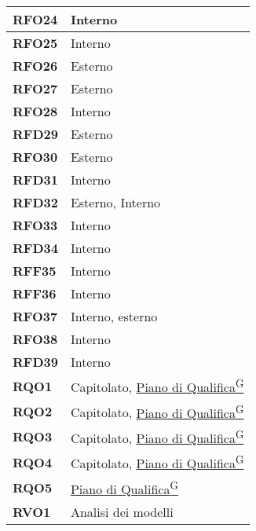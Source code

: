 \begin{longtable}{|>{\centering\arraybackslash}m{}|>{\centering\arraybackslash}m{}|}
	\textbf{RFO24}            & Interno\\\hline
	\textbf{RFO25}            & Interno\\\hline
	\textbf{RFO26}            & Esterno\\\hline
	\textbf{RFO27}            & Esterno\\\hline
	\textbf{RFO28}            & Interno\\\hline
	\textbf{RFD29}            & Esterno\\\hline
	\textbf{RFO30}            & Esterno\\\hline
	\textbf{RFD31}            & Interno\\\hline
	\textbf{RFD32}            & Esterno, Interno\\\hline
	\textbf{RFO33}            & Interno\\\hline
	\textbf{RFD34}            & Interno\\\hline
	\textbf{RFF35}            & Interno\\\hline
	\textbf{RFF36}            & Interno\\\hline
	\textbf{RFO37}            & Interno, esterno\\\hline
	\textbf{RFO38}            & Interno\\\hline
	\textbf{RFD39}            & Interno\\\hline
	\textbf{RQO1}            & Capitolato, \href{https://code7crusaders.github.io/docs/RTB/documentazione_interna/glossario.html#piano-di-qualifica}{Piano di Qualifica\textsuperscript{G}}\\\hline
	\textbf{RQO2}            & Capitolato, \href{https://code7crusaders.github.io/docs/RTB/documentazione_interna/glossario.html#piano-di-qualifica}{Piano di Qualifica\textsuperscript{G}}\\\hline
	\textbf{RQO3}            & Capitolato, \href{https://code7crusaders.github.io/docs/RTB/documentazione_interna/glossario.html#piano-di-qualifica}{Piano di Qualifica\textsuperscript{G}}\\\hline
	\textbf{RQO4}            & Capitolato, \href{https://code7crusaders.github.io/docs/RTB/documentazione_interna/glossario.html#piano-di-qualifica}{Piano di Qualifica\textsuperscript{G}}\\\hline
	\textbf{RQO5}            & \href{https://code7crusaders.github.io/docs/RTB/documentazione_interna/glossario.html#piano-di-qualifica}{Piano di Qualifica\textsuperscript{G}}\\\hline
	\textbf{RVO1}			 & Analisi dei modelli\\\hline

\end{longtable}
